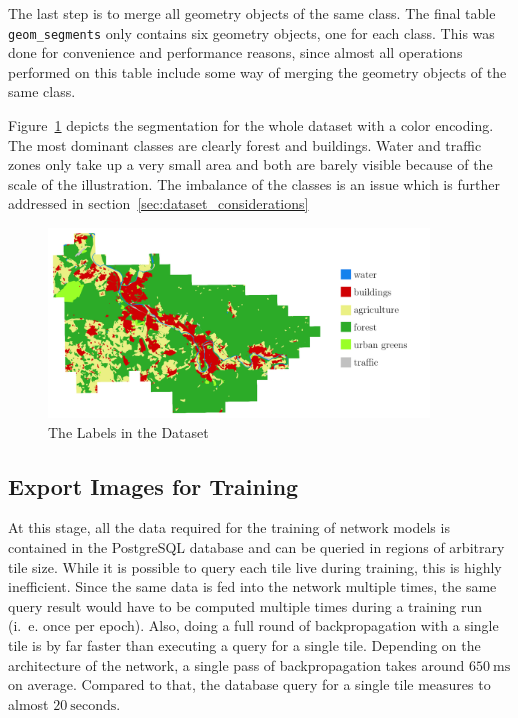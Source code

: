 The last step is to merge all geometry objects of the same class. The final table \texttt{geom\_segments} only contains six geometry objects, one for each class. This was done for convenience and performance reasons, since almost all operations performed on this table include some way of merging the geometry objects of the same class.

Figure~\ref{fig:dop_label_all} depicts the segmentation for the whole dataset with a color encoding. The most dominant classes are clearly forest and buildings. Water and traffic zones only take up a very small area and both are barely visible because of the scale of the illustration. The imbalance of the classes is an issue which is further addressed in section~\ref{sec:dataset_considerations}

\begin{figure}[h]
    \centering
    \includegraphics[width=0.9\textwidth]{images/dop_label_all}
    \caption{The Labels in the Dataset}
    \label{fig:dop_label_all}
\end{figure}

\subsection{Export Images for Training}
\label{sec:image_export}
At this stage, all the data required for the training of network models is contained in the PostgreSQL database and can be queried in regions of arbitrary tile size. While it is possible to query each tile live during training, this is highly inefficient. Since the same data is fed into the network multiple times, the same query result would have to be computed multiple times during a training run (i.~e. once per epoch). Also, doing a full round of backpropagation with a single tile is by far faster than executing a query for a single tile. Depending on the architecture of the network, a single pass of backpropagation takes around $650~\text{ms}$ on average. Compared to that, the database query for a single tile measures to almost $20~\text{seconds}$.

